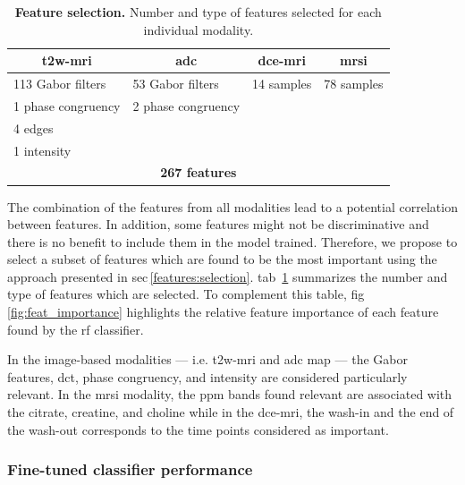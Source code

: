 \documentclass[final,3p,times,twocolumn]{elsarticle}
\begin{document}
\begin{table}
  \caption{\textbf{Feature selection.} Number and type of features selected for
  each individual modality.}
  \centering
  \scriptsize
  \begin{tabular}{llll}
    \toprule
    \multicolumn{1}{c}{\textbf{\acs*{t2w}-\acs*{mri}}} & \multicolumn{1}{c}{\textbf{\acs*{adc}}} & \multicolumn{1}{c}{\textbf{\acs*{dce}-\acs*{mri}}} & \multicolumn{1}{c}{\textbf{\acs*{mrsi}}} \\
    \midrule
    113 Gabor filters & 53 Gabor filters & 14 samples  & 78 samples \\
    1 phase congruency & 2 phase congruency & & \\
    4 edges & & & \\
    1 intensity & & & \\
    \midrule
    \multicolumn{4}{c}{\textbf{267 features}} \\
    \bottomrule
  \end{tabular}
  \label{tab:selfeatocc}
\end{table}

The combination of the features from all modalities lead to a potential
correlation between features. In addition, some features might not be
discriminative and there is no benefit to include them in the model
trained. Therefore, we propose to select a subset of features which are found
to be the most important using the approach presented in
\acs{sec}\,\ref{features:selection}. \Acl{tab}~\ref{tab:selfeatocc} summarizes
the number and type of features which are selected. To complement this table,
\acs{fig}\,\ref{fig:feat_importance} highlights the relative feature importance
of each feature found by the \ac{rf} classifier.

In the image-based modalities --- i.e. \ac{t2w}-\ac{mri} and \ac{adc} map ---
the Gabor features, \ac{dct}, phase congruency, and intensity are considered
particularly relevant. In the \ac{mrsi} modality, the \si{ppm} bands found
relevant are associated with the citrate, creatine, and choline while in the
\ac{dce}-\ac{mri}, the wash-in and the end of the wash-out corresponds to the
time points considered as important.

\subsubsection{Fine-tuned classifier performance}\label{exp:classification}
\end{document}

